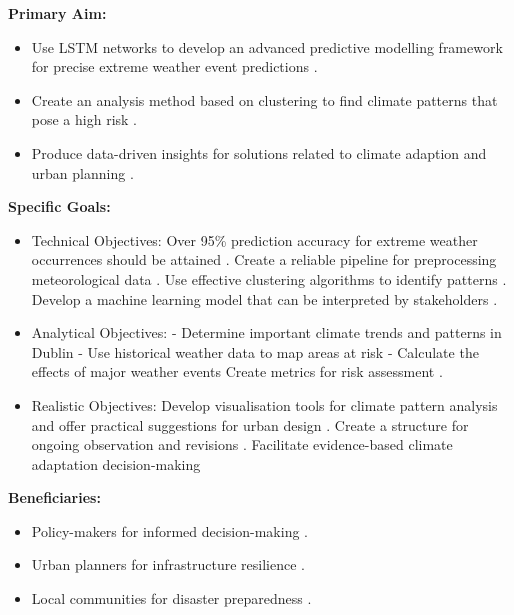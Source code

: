 \documentclass[a4paper]{report}
\begin{document}
\textbf{Primary Aim:}
\begin{itemize}
    \item Use LSTM networks to develop an advanced predictive modelling framework for precise extreme weather event predictions \cite{chen2023}.
    \item Create an analysis method based on clustering to find climate patterns that pose a high risk \cite{jackson2023}.
    \item Produce data-driven insights for solutions related to climate adaption and urban planning \cite{mitchell2024}.
\end{itemize}

\textbf{Specific Goals:}
\begin{itemize}
    \item Technical Objectives:
   Over 95\% prediction accuracy for extreme weather occurrences should be attained \cite{rodriguez2023}.
   Create a reliable pipeline for preprocessing meteorological data \cite{thompson2024}. Use effective clustering algorithms to identify patterns \cite{jackson2023}.
   Develop a machine learning model that can be interpreted by stakeholders \cite{wang2023}.
    \item Analytical Objectives: - Determine important climate trends and patterns in Dublin \cite{foster2024} - Use historical weather data to map areas at risk \cite{murphy2023} - Calculate the effects of major weather events \cite{smith2024}
   Create metrics for risk assessment \cite{patel2024}.
    \item Realistic Objectives:
   Develop visualisation tools for climate pattern analysis and offer practical suggestions for urban design \cite{harris2024}.
   Create a structure for ongoing observation and revisions \cite{garcia2023}.
   Facilitate evidence-based climate adaptation decision-making \cite{brown2024}
\end{itemize}

\textbf{Beneficiaries:}
\begin{itemize}
    \item Policy-makers for informed decision-making \cite{brown2024}.
    \item Urban planners for infrastructure resilience \cite{mitchell2024}.
    \item Local communities for disaster preparedness \cite{smith2024}.
\end{itemize}
\end{document}
